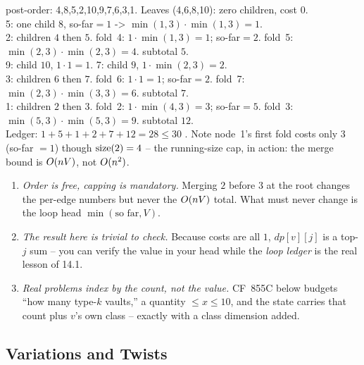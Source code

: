 \begin{tracebox}[Merge ledger on $T$, $V=3$, children folded in numeric order]
post-order: 4,8,5,2,10,9,7,6,3,1. Leaves (4,6,8,10): zero children, cost $0$.\\
5: one child $8$, so-far$=1$ -> $\min(1,3)\!\cdot\!\min(1,3)=1$.\\
2: children $4$ then $5$. fold~4: $1\!\cdot\!\min(1,3)=1$; so-far$=2$.
   fold~5: $\min(2,3)\!\cdot\!\min(2,3)=4$. subtotal $5$.\\
9: child $10$, $1\!\cdot\!1=1$. 7: child $9$, $1\!\cdot\!\min(2,3)=2$.\\
3: children $6$ then $7$. fold~6: $1\!\cdot\!1=1$; so-far$=2$.
   fold~7: $\min(2,3)\!\cdot\!\min(3,3)=6$. subtotal $7$.\\
1: children $2$ then $3$. fold~2: $1\!\cdot\!\min(4,3)=3$; so-far$=5$.
   fold~3: $\min(5,3)\!\cdot\!\min(5,3)=9$. subtotal $12$.\\
Ledger: $1{+}5{+}1{+}2{+}7{+}12 = 28 \le 30$ \checkmark. Note node~1's first fold
costs only $3$ (so-far $=1$) though $\operatorname{size}(2)=4$ -- the running-size cap, in
action: the merge bound  is $O(nV)$, not $O(n^2)$. \checkmark
\end{tracebox}

\begin{insightbox}
\begin{enumerate}[nosep, leftmargin=1.6em]
  \item \emph{Order is free, capping is mandatory.} Merging $2$ before $3$ at
        the root changes the per-edge numbers but never the $O(nV)$ total.
        What must never change is the loop head $\min(\text{so far}, V)$.
  \item \emph{The result here is trivial to check.} Because costs are all $1$,
        $\mathit{dp}[v][j]$ is a top-$j$ sum -- you can verify the value in your
        head while the \emph{loop ledger} is the real lesson of 14.1.
  \item \emph{Real problems index by the count, not the value.} CF~855C below
        budgets ``how many type-$k$ vaults,'' a quantity $\le x \le 10$, and the
        state carries that count plus $v$'s own class -- exactly 
        with a class dimension added.
\end{enumerate}
\end{insightbox}

\subsection{Variations and Twists}

